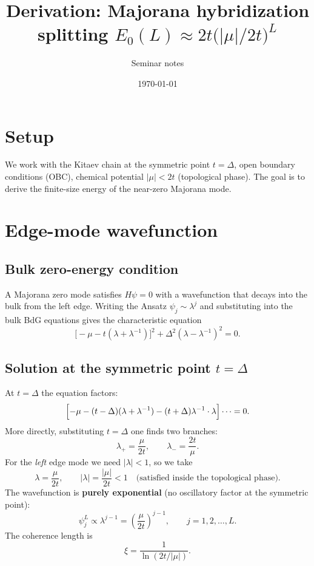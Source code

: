 \documentclass[11pt]{article}
\title{Derivation: Majorana hybridization splitting $E_0(L) \approx 2t\bigl(|\mu|/2t\bigr)^L$}
\author{Seminar notes}
\date{\today}
\begin{document}
\maketitle

\section{Setup}

We work with the Kitaev chain at the symmetric point $t = \Delta$, open boundary
conditions (OBC), chemical potential $|\mu| < 2t$ (topological phase).
The goal is to derive the finite-size energy of the near-zero Majorana mode.

\section{Edge-mode wavefunction}

\subsection{Bulk zero-energy condition}

A Majorana zero mode satisfies $H\psi = 0$ with a wavefunction that decays
into the bulk from the left edge.  Writing the Ansatz $\psi_j \sim \lambda^j$
and substituting into the bulk BdG equations gives the characteristic equation
\begin{equation}
  \bigl[-\mu - t(\lambda + \lambda^{-1})\bigr]^2
  + \Delta^2(\lambda - \lambda^{-1})^2 = 0.
\end{equation}

\subsection{Solution at the symmetric point $t = \Delta$}

At $t = \Delta$ the equation factors:
\begin{equation}
  \Bigl[-\mu - (t-\Delta)(\lambda+\lambda^{-1}) - (t+\Delta)\lambda^{-1}\cdot\lambda \Bigr]\cdots = 0.
\end{equation}
More directly, substituting $t=\Delta$ one finds two branches:
\begin{equation}
  \lambda_+ = \frac{\mu}{2t}, \qquad \lambda_- = \frac{2t}{\mu}.
\end{equation}
For the \emph{left} edge mode we need $|\lambda| < 1$, so we take
\begin{equation}
  \lambda = \frac{\mu}{2t}, \qquad |\lambda| = \frac{|\mu|}{2t} < 1
  \quad \text{(satisfied inside the topological phase)}.
\end{equation}
The wavefunction is \textbf{purely exponential} (no oscillatory factor at the
symmetric point):
\begin{equation}
  \psi_j^L \propto \lambda^{j-1} = \left(\frac{\mu}{2t}\right)^{j-1},
  \qquad j = 1, 2, \ldots, L.
\end{equation}
The coherence length is
\begin{equation}
  \xi = \frac{1}{\ln(2t/|\mu|)}.
\end{equation}
\end{document}
